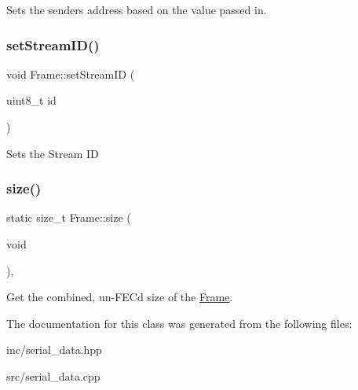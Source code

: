 Sets the sender\textquotesingle{}s address based on the value passed in. \mbox{\label{classFrame_af3cc33a2ea60ad84db23097da6df3c31}} 
\subsubsection{\texorpdfstring{set\+Stream\+I\+D()}{setStreamID()}}
{\footnotesize\ttfamily void Frame\+::set\+Stream\+ID (\begin{DoxyParamCaption}\item[{uint8\+\_\+t}]{id }\end{DoxyParamCaption})\hspace{0.3cm}{\ttfamily [inline]}}

Sets the Stream ID \mbox{\label{classFrame_a2e2305d6c4488220574ec0415fe217b5}} 
\subsubsection{\texorpdfstring{size()}{size()}}
{\footnotesize\ttfamily static size\+\_\+t Frame\+::size (\begin{DoxyParamCaption}\item[{void}]{ }\end{DoxyParamCaption})\hspace{0.3cm}{\ttfamily [inline]}, {\ttfamily [static]}}

Get the combined, un-\/\+F\+EC\textquotesingle{}d size of the \hyperlink{classFrame}{Frame}. 

The documentation for this class was generated from the following files\+:\begin{DoxyCompactItemize}
\item 
inc/serial\+\_\+data.\+hpp\item 
src/serial\+\_\+data.\+cpp\end{DoxyCompactItemize}
